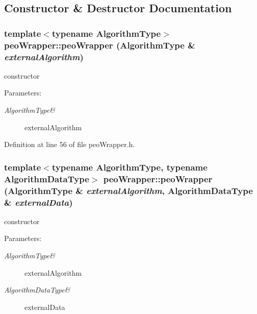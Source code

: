 \subsection{Constructor \& Destructor Documentation}
\hypertarget{classpeoWrapper_b0a651003934a41269db4b9f09696b7b}{
\subsubsection[peoWrapper]{\setlength{\rightskip}{0pt plus 5cm}template$<$typename Algorithm\-Type$>$ peo\-Wrapper::peo\-Wrapper (Algorithm\-Type \& {\em external\-Algorithm})}}
\label{classpeoWrapper_b0a651003934a41269db4b9f09696b7b}


constructor 

\begin{Desc}
\item[Parameters:]
\begin{description}
\item[{\em Algorithm\-Type\&}]external\-Algorithm \end{description}
\end{Desc}


Definition at line 56 of file peo\-Wrapper.h.\hypertarget{classpeoWrapper_f995a4006a82472f3465b079ae303a57}{
\subsubsection[peoWrapper]{\setlength{\rightskip}{0pt plus 5cm}template$<$typename Algorithm\-Type, typename Algorithm\-Data\-Type$>$ peo\-Wrapper::peo\-Wrapper (Algorithm\-Type \& {\em external\-Algorithm}, Algorithm\-Data\-Type \& {\em external\-Data})}}
\label{classpeoWrapper_f995a4006a82472f3465b079ae303a57}


constructor 

\begin{Desc}
\item[Parameters:]
\begin{description}
\item[{\em Algorithm\-Type\&}]external\-Algorithm \item[{\em Algorithm\-Data\-Type\&}]external\-Data \end{description}
\end{Desc}


